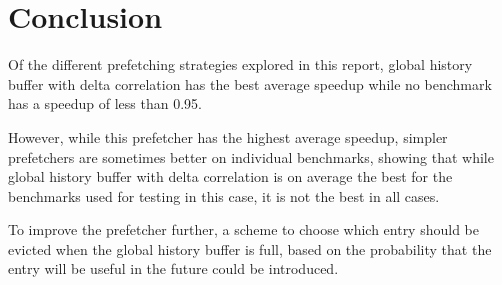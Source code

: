 \section{Conclusion}
\label{sec:conclusion}

Of the different prefetching strategies explored in this report,
global history buffer with delta correlation has the best average
speedup while no benchmark has a speedup of less than 0.95.

However, while this prefetcher has the highest average
speedup, simpler prefetchers are sometimes better on
individual benchmarks, showing that while global history buffer
with delta correlation is on average the best for the benchmarks
used for testing in this case, it is not the best in all cases.

To improve the prefetcher further, a scheme to choose which
entry should be evicted when the global history buffer is full,
based on the probability that the entry will be useful in the
future could be introduced.

